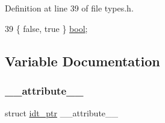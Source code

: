 Definition at line 39 of file types.\+h.


\begin{DoxyCode}
39 \{ \textcolor{keyword}{false}, \textcolor{keyword}{true} \} \hyperlink{a00035_af6a258d8f3ee5206d682d799316314b1_af6a258d8f3ee5206d682d799316314b1}{bool};
\end{DoxyCode}


\subsection{Variable Documentation}
\mbox{\label{a00035_acf8c839d8a7a12772ebd4b8a4c087034_acf8c839d8a7a12772ebd4b8a4c087034}} 
\subsubsection{\texorpdfstring{\+\_\+\+\_\+attribute\+\_\+\+\_\+}{\_\_attribute\_\_}}
{\footnotesize\ttfamily struct \hyperlink{a00054}{idt\+\_\+ptr} \+\_\+\+\_\+attribute\+\_\+\+\_\+}

